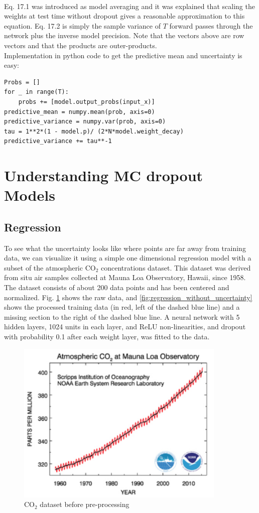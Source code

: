 \\
Eq. 17.1 was introduced as model averaging and it was explained that scaling the weights at test time without dropout gives a reasonable approximation to this equation. Eq. 17.2 is simply the sample variance of $T$ forward passes through the network plus the inverse model precision. Note that the vectors above are row vectors and that the products are outer-products.
\\
Implementation in python code to get the predictive mean and uncertainty is easy:

\begin{verbatim}
Probs = []
for _ in range(T):
    probs += [model.output_probs(input_x)]
predictive_mean = numpy.mean(prob, axis=0)
predictive_variance = numpy.var(prob, axis=0)
tau = 1**2*(1 - model.p)/ (2*N*model.weight_decay)
predictive_variance += tau**-1
\end{verbatim}

\section{Understanding MC dropout Models}
\subsection{Regression}
To see what the uncertainty looks like where points are far away from training data, we can visualize it using a simple one dimensional regression model with a subset of the atmospheric CO$_2$ concentrations dataset. This dataset was derived from situ air samples collected at Mauna Loa Observatory, Hawaii, since 1958. The dataset consists of about 200 data points and has been centered and normalized. Fig. \ref{fig:co2_concentration} shows the raw data, and \ref{fig:regression_without_uncertainty} shows the processed training data (in red, left of the dashed blue line) and a missing section to the right of the dashed blue line. A neural network with 5 hidden layers, 1024 units in each layer, and ReLU non-linearities, and dropout with probability 0.1 after each weight layer, was fitted to the data.

\begin{figure}[H]
    \centering
    \includegraphics[width=10cm]{figs/CO2 concentration.png}
    \caption{CO$_2$ dataset before pre-processing}
    \label{fig:co2_concentration}
\end{figure}

